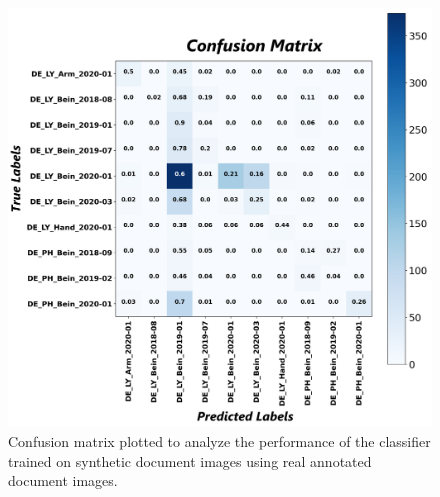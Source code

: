 \begin{figure}[H]
    \begin{center}
	\includegraphics[scale=0.25]{images/Appendix/Confusion_Matrix_Synthetic_Data_Classifier_2021-05-31_16-40-33.png}
	\caption[Confusion matrix plotted to analyze the performance of the classifier trained on synthetic document images using real annotated document images.]{Confusion matrix plotted to analyze the performance of the classifier trained on synthetic document images using real annotated document images.}
	\label{fig:CMSyntheticDocumentImagesClassifier}
	\end{center}
\end{figure}



